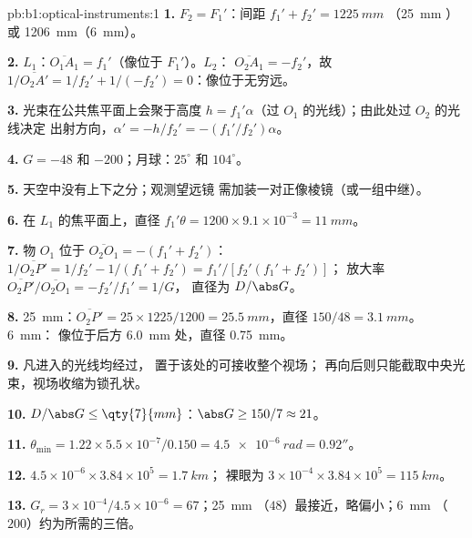 \begin{solution}{pb:b1:optical-instruments:1}
\textbf{1.} $F_2 = F_1'$：间距 $f_1' + f_2' = \qty{1225}{mm}$
（\qty{25}{mm} ）或 \qty{1206}{mm}（\qty{6}{mm}）。

\textbf{2.} $L_1$：$\overline{O_1A_1} = f_1'$（像位于 $F_1'$）。$L_2$：
$\overline{O_2A_1} = -f_2'$，故 $1/\overline{O_2A'} = 1/f_2' + 1/(-f_2')
= 0$：像位于无穷远。

\textbf{3.} 光束在公共焦平面上会聚于高度 $h =
f_1'\alpha$（过 $O_1$ 的光线）；由此处过 $O_2$ 的光线决定
出射方向，$\alpha' = -h/f_2' = -(f_1'/f_2')\alpha$。

\textbf{4.} $G = -48$ 和 $-200$；月球：$25^\circ$ 和 $104^\circ$。

\textbf{5.} 天空中没有上下之分；观测望远镜
需加装一对正像棱镜（或一组中继）。

\textbf{6.} 在 $L_1$ 的焦平面上，直径 $f_1'\theta = 1200 \times
9.1\times10^{-3} = \qty{11}{mm}$。

\textbf{7.} 物 $O_1$ 位于 $\overline{O_2O_1} = -(f_1' + f_2')$：
$1/\overline{O_2P'} = 1/f_2' - 1/(f_1' + f_2') = f_1'/[f_2'(f_1' + f_2')]$；
放大率 $\overline{O_2P'}/\overline{O_2O_1} = -f_2'/f_1' = 1/G$，
直径为 $D/\abs G$。

\textbf{8.} \qty{25}{mm}：$\overline{O_2P'} = 25 \times 1225/1200 =
\qty{25.5}{mm}$，直径 $150/48 = \qty{3.1}{mm}$。\qty{6}{mm}：
像位于后方 \qty{6.0}{mm} 处，直径 \qty{0.75}{mm}。

\textbf{9.} 凡进入的光线均经过，
置于该处的可接收整个视场；
再向后则只能截取中央光束，视场收缩为锁孔状。

\textbf{10.} $D/\abs G \leq \qty{7}{mm}$：$\abs G \geq 150/7 \approx 21$。

\textbf{11.} $\theta_{\min} = 1.22 \times 5.5\times10^{-7}/0.150 =
\qty{4.5e-6}{rad} = 0.92''$。

\textbf{12.} $4.5\times10^{-6} \times 3.84\times10^5 = \qty{1.7}{km}$；
裸眼为 $3\times10^{-4} \times 3.84\times10^5 = \qty{115}{km}$。

\textbf{13.} $G_r = 3\times10^{-4}/4.5\times10^{-6} = 67$；\qty{25}{mm}
（$48$）最接近，略偏小；\qty{6}{mm}
（$200$）约为所需的三倍。


\end{solution}
